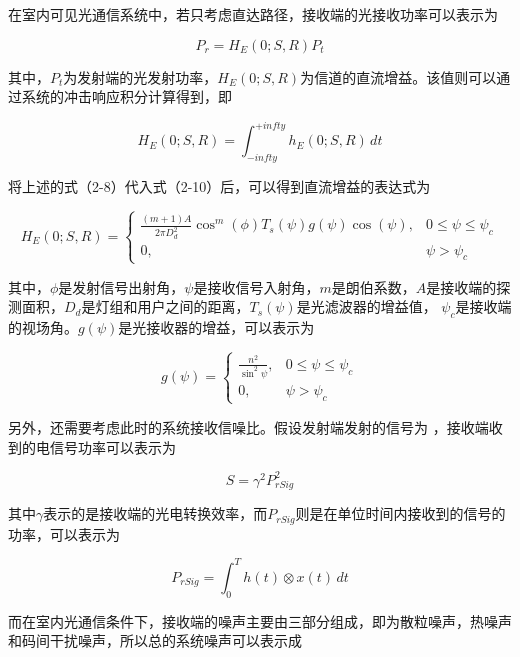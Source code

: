 在室内可见光通信系统中，若只考虑直达路径，接收端的光接收功率可以表示为

\begin{equation}
    P_{r}=H_{E}(0;S,R)P_{t}
\end{equation}

其中，$P_{t}$为发射端的光发射功率，$H_{E}(0;S,R)$为信道的直流增益。该值则可以通过系统的冲击响应积分计算得到，即

\begin{equation}
    H_{E}(0;S,R)=\int_{-infty}^{+infty} h_{E}(0;S,R)\, dt
\end{equation}

将上述的式（2-8）代入式（2-10）后，可以得到直流增益的表达式为

\begin{equation}
    H_{E}(0;S,R)=
    \begin{cases}
        \frac{(m+1)A}{2\pi D_{d}^2}\cos^m(\phi)T_{s}(\psi)g(\psi)\cos(\psi),  & 0\le\psi\le\psi_{c} \\
        0,  & \psi>\psi_{c}
    \end{cases}
\end{equation}

其中，$\phi$是发射信号出射角，$\psi$是接收信号入射角，$m$是朗伯系数，$A$是接收端的探测面积，$D_{d}$是灯组和用户之间的距离，$T_{s}(\psi)$是光滤波器的增益值， $\psi_{c}$是接收端的视场角。$g(\psi)$是光接收器的增益，可以表示为

\begin{equation}
    g(\psi)=
    \begin{cases}
        \frac{n^2}{\sin^2\psi},  & 0\le\psi\le\psi_{c} \\
        0,  & \psi>\psi_{c}
    \end{cases}
\end{equation}

另外，还需要考虑此时的系统接收信噪比。假设发射端发射的信号为 ，接收端收到的电信号功率可以表示为

\begin{equation}
    S=\gamma^2P_{rSig}^2
\end{equation}

其中$\gamma$表示的是接收端的光电转换效率，而$P_{rSig}$则是在单位时间内接收到的信号的功率，可以表示为

\begin{equation}
    P_{rSig}=\int_{0}^{T} h(t) \otimes x(t)\, dt
\end{equation}

而在室内光通信条件下，接收端的噪声主要由三部分组成，即为散粒噪声，热噪声和码间干扰噪声\cite{WuXia2014}，所以总的系统噪声可以表示成

